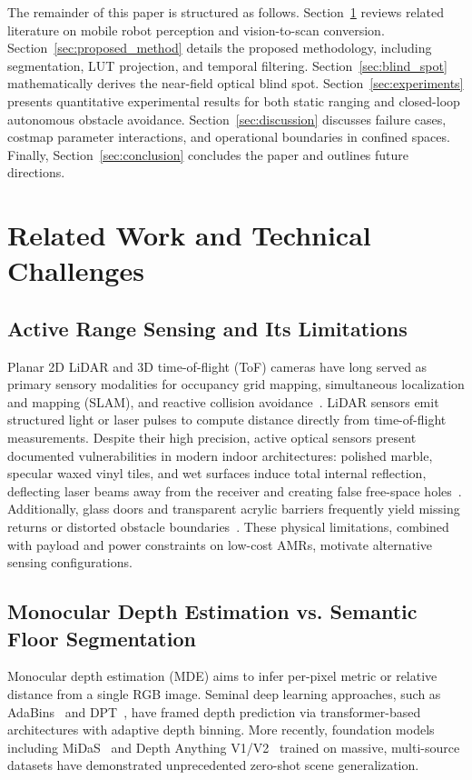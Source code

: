\documentclass{ieeeaccess}
\begin{document}
The remainder of this paper is structured as follows. Section~\ref{sec:related_work} reviews related literature on mobile robot perception and vision-to-scan conversion. Section~\ref{sec:proposed_method} details the proposed methodology, including segmentation, LUT projection, and temporal filtering. Section~\ref{sec:blind_spot} mathematically derives the near-field optical blind spot. Section~\ref{sec:experiments} presents quantitative experimental results for both static ranging and closed-loop autonomous obstacle avoidance. Section~\ref{sec:discussion} discusses failure cases, costmap parameter interactions, and operational boundaries in confined spaces. Finally, Section~\ref{sec:conclusion} concludes the paper and outlines future directions.

\section{Related Work and Technical Challenges}
\label{sec:related_work}

\subsection{Active Range Sensing and Its Limitations}
Planar 2D LiDAR and 3D time-of-flight (ToF) cameras have long served as primary sensory modalities for occupancy grid mapping, simultaneous localization and mapping (SLAM), and reactive collision avoidance~\cite{li_2020_lidar,thrun_2010_probabilistic,elfes_1989_using}. LiDAR sensors emit structured light or laser pulses to compute distance directly from time-of-flight measurements. Despite their high precision, active optical sensors present documented vulnerabilities in modern indoor architectures: polished marble, specular waxed vinyl tiles, and wet surfaces induce total internal reflection, deflecting laser beams away from the receiver and creating false free-space holes~\cite{deepthadamodaran_2023_experimental,yang_2011_on}. Additionally, glass doors and transparent acrylic barriers frequently yield missing returns or distorted obstacle boundaries~\cite{tibebu_2021_lidarbased,wang_2017_detecting}. These physical limitations, combined with payload and power constraints on low-cost AMRs, motivate alternative sensing configurations.

\subsection{Monocular Depth Estimation vs. Semantic Floor Segmentation}
\label{subsec:mde_vs_floor}
Monocular depth estimation (MDE) aims to infer per-pixel metric or relative distance from a single RGB image. Seminal deep learning approaches, such as AdaBins~\cite{shariqfarooqbhat_2021_adabins} and DPT~\cite{ranftl_2021_vision}, have framed depth prediction via transformer-based architectures with adaptive depth binning. More recently, foundation models including MiDaS~\cite{ranftl_2020_towards} and Depth Anything V1/V2~\cite{yang_2024_depth} trained on massive, multi-source datasets have demonstrated unprecedented zero-shot scene generalization. 
\end{document}
